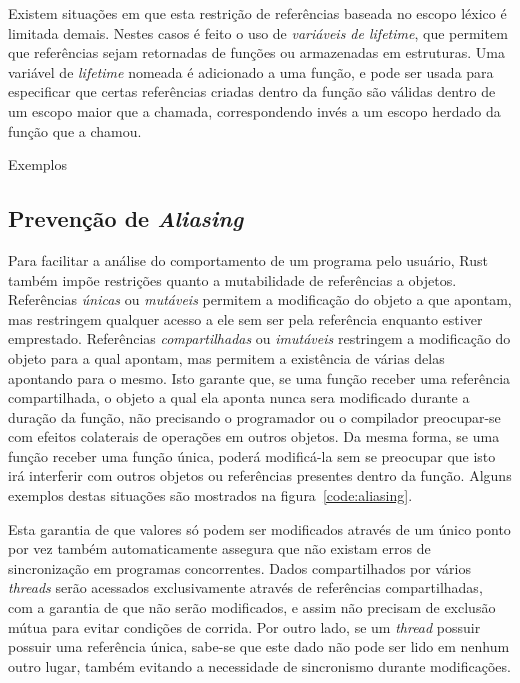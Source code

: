 \documentclass[tg]{mdtufsm}
\newcommand{\todo}[1]{\textsf{\color{red}#1}}
\begin{document}
Existem situações em que esta restrição de referências baseada no escopo léxico é limitada demais. Nestes casos é feito o uso de \emph{variáveis de lifetime}, que permitem que referências sejam retornadas de funções ou armazenadas em estruturas. Uma variável de \emph{lifetime} nomeada é adicionado a uma função, e pode ser usada para especificar que certas referências criadas dentro da função são válidas dentro de um escopo maior que a chamada, correspondendo invés a um escopo herdado da função que a chamou. \citep{rust-lifetimes}

\todo{Exemplos}

\subsection{Prevenção de \emph{Aliasing}}

Para facilitar a análise do comportamento de um programa pelo usuário, Rust também impõe restrições quanto a mutabilidade de referências a objetos. Referências \emph{únicas} ou \emph{mutáveis} permitem a modificação do objeto a que apontam, mas restringem qualquer acesso a ele sem ser pela referência enquanto estiver emprestado. Referências \emph{compartilhadas} ou \emph{imutáveis} restringem a modificação do objeto para a qual apontam, mas permitem a existência de várias delas apontando para o mesmo. Isto garante que, se uma função receber uma referência compartilhada, o objeto a qual ela aponta nunca sera modificado durante a duração da função, não precisando o programador ou o compilador preocupar-se com efeitos colaterais de operações em outros objetos. Da mesma forma, se uma função receber uma função única, poderá modificá-la sem se preocupar que isto irá interferir com outros objetos ou referências presentes dentro da função. Alguns exemplos destas situações são mostrados na figura~\ref{code:aliasing}. \citep{rust-lifetimes}

Esta garantia de que valores só podem ser modificados através de um único ponto por vez também automaticamente assegura que não existam erros de sincronização em programas concorrentes. Dados compartilhados por vários \emph{threads} serão acessados exclusivamente através de referências compartilhadas, com a garantia de que não serão modificados, e assim não precisam de exclusão mútua para evitar condições de corrida. Por outro lado, se um \emph{thread} possuir possuir uma referência única, sabe-se que este dado não pode ser lido em nenhum outro lugar, também evitando a necessidade de sincronismo durante modificações.
\end{document}
